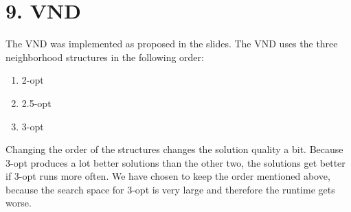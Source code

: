 \section*{9. VND}
The VND was implemented as proposed in the slides. The VND uses the three neighborhood structures in the following order:
\begin{enumerate}
  \item 2-opt
  \item 2.5-opt
  \item 3-opt
\end{enumerate}
Changing the order of the structures changes the solution quality a bit. Because 3-opt produces a lot better solutions than the other two, the solutions get better if 3-opt runs more often. We have chosen to keep the order mentioned above, because the search space for 3-opt is very large and therefore the runtime gets worse.